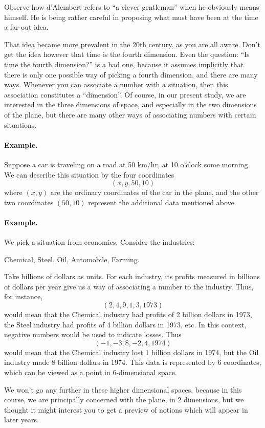 \documentclass[12pt]{book} %
\begin{document}
Observe how d'Alembert refers to ``a clever gentleman'' when he obviously means himself. He is being rather careful in proposing what must have been at the time a far-out idea.

That idea became more prevalent in the 20th century, as you are all aware. Don't get the idea however that time is the fourth dimension. Even the question: ``Is time the fourth dimension?'' is a bad one, because it assumes implicitly that there is only one possible way of picking a fourth dimension, and there are many ways. Whenever you can associate a number with a situation, then this association constitutes a ``dimension''. Of course, in our present study, we are interested in the three dimensions of space, and especially in the two dimensions of the plane, but there are many other ways of associating numbers with certain situations.

\paragraph{Example.}
Suppose a car is traveling on a road at 50 km/hr, at 10 o'clock some morning. We can describe this situation by the four coordinates
\[
(x,y,50,10)
\]
where $(x,y)$ are the ordinary coordinates of the car in the plane, and the other two coordinates $(50,10)$ represent the additional data mentioned above.

\paragraph{Example.}
We pick a situation from economics. Consider the industries:
\begin{center}
Chemical, Steel, Oil, Automobile, Farming.
\end{center}

Take billions of dollars as units. For each industry, its profits measured in billions of dollars per year give us a way of associating a number to the industry. Thus, for instance,
\[
(2,4,9,1,3,1973)
\]
would mean that the Chemical industry had profits of 2 billion dollars in 1973, the Steel industry had profits of 4 billion dollars in 1973, etc. In this context, negative numbers would be used to indicate losses. Thus
\[
(-1,-3,8,-2,4,1974)
\]
would mean that the Chemical industry lost 1 billion dollars in 1974, but the Oil industry made 8 billion dollars in 1974. This data is represented by 6 coordinates, which can be viewed as a point in 6-dimensional space.

We won't go any further in these higher dimensional spaces, because in this course, we are principally concerned with the plane, in 2 dimensions, but we thought it might interest you to get a preview of notions which will appear in later years.
\end{document}
